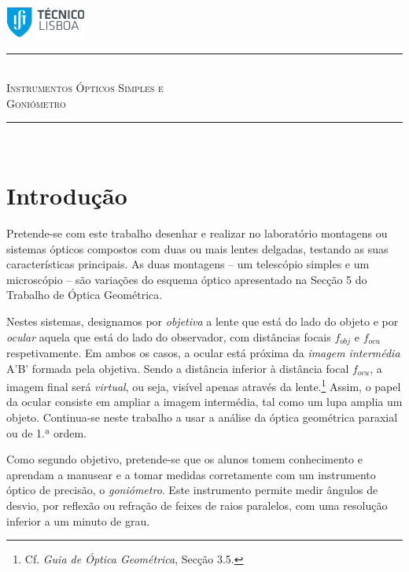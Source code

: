 \documentclass[a4paper,12pt]{article}      %
\author{Prof. Bernardo B. Carvalho}
\date{ Outubro 2012}
\newcommand{\HRule}{\rule{\linewidth}{0.5mm}}
\begin{document}
 

	\includegraphics[width=0.2\textwidth]{../../logo-ist}%

	\HRule \\[0.5cm]
	{ \huge \sf  \textsc{Instrumentos Ópticos Simples e \\ Goniómetro}} \\[0.4cm] %
	\HRule \\%

\section{\sf Introdução}
Pretende-se com este trabalho desenhar e realizar no laboratório montagens ou sistemas ópticos compostos com duas ou mais lentes delgadas, testando as suas características principais. As duas montagens -- um telescópio simples e um microscópio -- são variações do esquema óptico apresentado na Secção 5 do Trabalho de Óptica Geométrica. 

Nestes sistemas, designamos por \emph{objetiva} a lente que está do lado do objeto e por \emph{ocular} aquela que está do lado do observador, com distâncias focais $f_{obj}$ e $f_{ocu}$ respetivamente. Em ambos os casos, a ocular está  próxima da \emph{imagem intermédia} A'B' formada pela objetiva. Sendo a distância inferior à distância focal $f_{ocu}$, a imagem final será \emph{virtual}, ou seja, visível apenas através da lente.\footnote{Cf. \emph{Guia de Óptica Geométrica}, Secção 3.5.}
Assim, o papel da ocular consiste em ampliar a imagem intermédia, tal como um lupa amplia um objeto.
 Continua-se neste trabalho a usar a análise da óptica geométrica paraxial ou de 1.ª ordem.


Como segundo objetivo, pretende-se que os alunos tomem conhecimento e aprendam a manusear e a tomar medidas corretamente  com um instrumento óptico de precisão, o \emph{goniómetro}. Este instrumento permite medir ângulos de desvio, por reflexão ou refração de feixes de raios paralelos, com uma resolução inferior a um minuto de grau.
\end{document}
